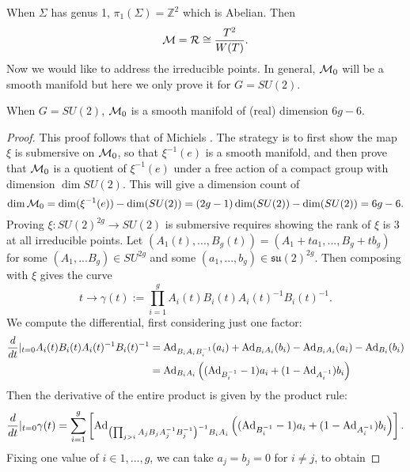 	When $\Sigma$ has genus 1, $\pi_1(\Sigma) = \mathbb{Z}^2$ which is Abelian. Then
	\begin{equation}
		\mathcal{M} = \mathcal{R} \cong \frac{T^{2}}{W(T)}.
	\end{equation}
	Now we would like to address the irreducible points. In general, $\mathcal{M}_0$ will be a smooth manifold \cite[\S7]{atiyah_yang-mills_1983} but here we only prove it for $G=SU(2)$. 
	\begin{theorem}
		When $G=SU(2)$, $\mathcal{M}_0$ is a smooth manifold of (real) dimension $6g-6$.
	\end{theorem}
	\begin{proof}
		This proof follows that of Michiels \cite[Thm 96]{michiels_moduli_nodate}. The strategy is to first show the map $\xi$ is submersive on $\mathcal{M}_0$, so that $\xi^{-1}(e)$ is a smooth manifold, and then prove that $\mathcal{M}_0$ is a quotient of $\xi^{-1}(e)$ under a free action of a compact group with dimension $\dim SU(2)$. This will give a dimension count of
		\begin{equation}
			\dim \mathcal{M}_0 = \dim(\xi^{-1}(e)) - \dim(SU(2)) = (2g-1)\dim(SU(2)) - \dim(SU(2)) = 6g-6.
		\end{equation} 
		Proving $\xi:SU(2)^{2g} \to SU(2)$ is submersive requires showing the rank of $\xi$ is 3 at all irreducible points. Let $(A_1(t),...,B_g(t)) = (A_1 + ta_1,..., B_g + tb_g)$ for some $(A_1,...B_g) \in SU^{2g}$ and some $(a_1,...,b_g) \in \mathfrak{su}(2)^{2g}$. Then composing with $\xi$ gives the curve
		\begin{equation}
			t\to \gamma(t):= \prod_{i=1}^g A_i(t)B_i(t)A_i(t)^{-1}B_i(t)^{-1}.
		\end{equation}
		We compute the differential, first considering just one factor:
		\begin{align*}
			\frac{d}{dt}|_{t=0} A_i(t)B_i(t)A_i(t)^{-1}B_i(t)^{-1} &= \text{Ad}_{B_iA_iB_i^{-1}}(a_i) + \text{Ad}_{B_iA_i}(b_i) - \text{Ad}_{B_iA_i}(a_i) - \text{Ad}_{B_i}(b_i)\\
			&= \text{Ad}_{B_iA_i}\left(
			(\text{Ad}_{B_i^{-1}}-1)a_i + (1-\text{Ad}_{A_i^{-1}})b_i
			\right)
		\end{align*}
		Then the derivative of the entire product is given by the product rule:
		\begin{equation}
			\frac{d}{dt}|_{t=0} \gamma(t) = \sum_{i=1}^g \left[
			\text{Ad}_{\left(\prod_{j>i} A_jB_jA_j^{-1}B_j^{-1}\right)^{-1}B_iA_i} \left((\text{Ad}_{B_i^{-1}}-1)a_i + (1-\text{Ad}_{A_i^{-1}})b_i\right)
			\right].
		\end{equation}
		Fixing one value of $i\in {1,...,g}$, we can take $a_j = b_j =0$ for $i\neq j$, to obtain

\end{proof}
